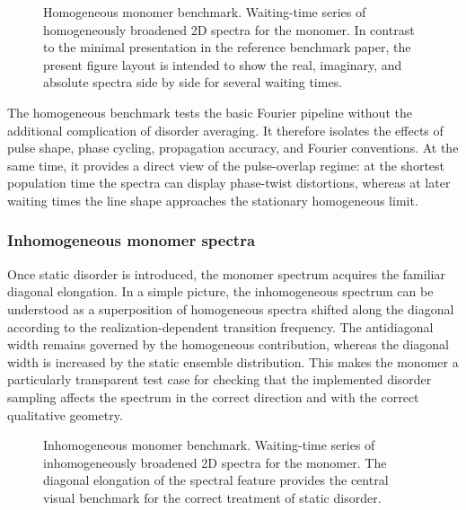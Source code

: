\begin{figure}[htbp]
    \centering
    \caption{Homogeneous monomer benchmark.
    Waiting-time series of homogeneously broadened 2D spectra for the monomer.
    In contrast to the minimal presentation in the reference benchmark paper,
    the present figure layout is intended to show the real, imaginary, and
    absolute spectra side by side for several waiting times.}
    \label{fig:rslts_monomer_2d_hom}
\end{figure}

The homogeneous benchmark tests the basic Fourier pipeline without the additional
complication of disorder averaging.
It therefore isolates the effects of pulse shape, phase cycling, propagation
accuracy, and Fourier conventions.
At the same time, it provides a direct view of the pulse-overlap regime:
at the shortest population time the spectra can display phase-twist distortions,
whereas at later waiting times the line shape approaches the stationary
homogeneous limit.

\subsubsection{Inhomogeneous monomer spectra}

Once static disorder is introduced, the monomer spectrum acquires the familiar
diagonal elongation.
In a simple picture, the inhomogeneous spectrum can be understood as a
superposition of homogeneous spectra shifted along the diagonal according to the
realization-dependent transition frequency.
The antidiagonal width remains governed by the homogeneous contribution, whereas
the diagonal width is increased by the static ensemble distribution.
This makes the monomer a particularly transparent test case for checking that the
implemented disorder sampling affects the spectrum in the correct direction and
with the correct qualitative geometry.

\begin{figure}[htbp]
    \centering
    \caption{Inhomogeneous monomer benchmark.
    Waiting-time series of inhomogeneously broadened 2D spectra for the monomer.
    The diagonal elongation of the spectral feature provides the central visual
    benchmark for the correct treatment of static disorder.}
    \label{fig:rslts_monomer_2d_inhom}
\end{figure}

